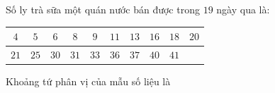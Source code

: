 \begin{ex}
Số ly trà sữa một quán nước bán được trong $19$ ngày qua là:
\begin{center}
\begin{tabular}{|c|c|c|c|c|c|c|c|c|c|}\hline
$4$ & $5$ & $6$ & $8$ & $9$ & $11$ & $13$ & $16$ & $18$ & $20$\\\hline
$21$ & $25$ & $30$ & $31$ & $33$ & $36$ & $37$ & $40$ & $41$ & \\\hline
\end{tabular}
\end{center}
Khoảng tứ phân vị của mẫu số liệu là
\end{ex}
